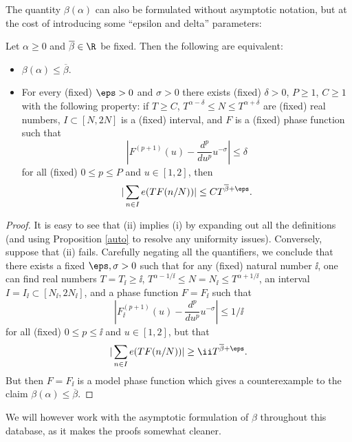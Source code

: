 The quantity $\beta(\alpha)$ can also be formulated without asymptotic notation, but at the cost of introducing some ``epsilon and delta'' parameters:

\begin{lemma}\label{beta-asymp}
\leanok
Let $\alpha \geq 0$ and $\overline{\beta} \in \R$ be fixed.  Then the following are equivalent:
\begin{itemize}
\item[(i)] $\beta(\alpha) \leq \overline{\beta}$.
\item[(ii)] For every (fixed) $\eps>0$ and $\sigma > 0$ there exists (fixed) $\delta>0$, $P \geq 1$, $C \geq 1$ with the following property: if $T \geq C$, $T^{\alpha-\delta} \leq N \leq T^{\alpha+\delta}$ are (fixed) real numbers, $I \subset [N,2N]$ is a (fixed) interval, and $F$ is a (fixed) phase function such that
\begin{equation}\label{fpu-bound}
     \left|F^{(p+1)}(u) - \frac{d^p}{du^p} u^{-\sigma}\right| \leq \delta
\end{equation}
for all (fixed) $0 \leq p \leq P$ and $u \in [1,2]$, then
$$ |\sum_{n \in I} e(T F(n/N))| \leq C T^{\overline{\beta}+\eps}.$$
\end{itemize}
\end{lemma}

\begin{proof}\leanok  It is easy to see that (ii) implies (i) by expanding out all the definitions (and using Proposition \ref{auto} to resolve any uniformity issues).  Conversely, suppose that (ii) fails.  Carefully negating all the quantifiers, we conclude that there exists a fixed $\eps, \sigma > 0$ such that for any (fixed) natural number $\ii$, one can find real numbers $T = T_{\ii} \geq \ii$, $T^{\alpha-1/\ii} \leq N = N_{\ii} \leq T^{\alpha+1/\ii}$, an interval $I = I_{\ii} \subset [N_\ii, 2N_\ii]$, and a phase function $F = F_{\ii}$ such that
$$ |F_\ii^{(p+1)}(u) - \frac{d^p}{du^p} u^{-\sigma}| \leq 1/\ii$$
for all (fixed) $0 \leq p \leq \ii$ and $u \in [1,2]$, but that
$$ |\sum_{n \in I} e(T F(n/N))| \geq \ii T^{\overline{\beta}+\eps}.$$
But then $F = F_\ii$ is a model phase function which gives a counterexample to the claim $\beta(\alpha) \leq \overline{\beta}$.
\end{proof}

We will however work with the asymptotic formulation of $\beta$ throughout this database, as it makes the proofs somewhat cleaner.

